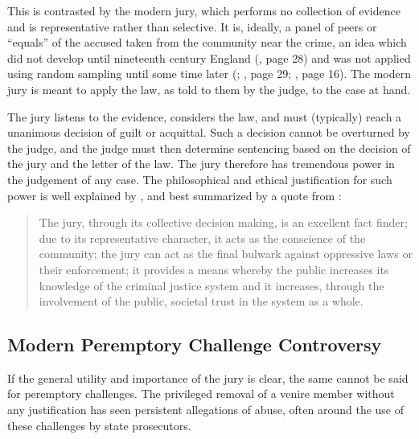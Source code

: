 This is contrasted by the modern jury, which performs no collection of evidence and is representative rather than
selective. It is, ideally, a panel of peers or ``equals'' of the accused taken from the community near the crime, an idea which
did not develop until nineteenth century England (\cite{hansvidjudging}, page 28) and was not applied using random sampling until
some time later (\cite{hoffman1997}; \cite{hansvidjudging}, page 29; \cite{vandykejurysel}, page 16). The modern jury
is meant to apply the law, as told to them by the judge\footnotemark, to the case at hand.

The jury listens to the evidence, considers the law, and must (typically) reach a unanimous
decision of guilt or acquittal. Such a decision cannot be overturned by the judge, and the judge must then determine
sentencing based on the decision of the jury and the letter of the law\footnotemark[\value{footnote}]. The
jury therefore has tremendous power in the judgement of any case. The philosophical and ethical justification for such power is
well explained by \cite{woolley2018}, and best summarized by a quote from \cite{rvsherratt}:


\begin{quote}
  The jury, through its collective decision making, is an excellent fact finder; due to its representative character, it acts as
  the conscience of the community; the jury can act as the final bulwark against oppressive laws or their enforcement; it provides
  a means whereby the public increases its knowledge of the criminal justice system and it increases, through the involvement of
  the public, societal trust in the system as a whole.
\end{quote}

\subsection{Modern Peremptory Challenge Controversy} \label{sec:modper}

If the general utility and importance of the jury is clear, the same cannot be said for peremptory challenges. The privileged
removal of a venire member without any justification
has seen persistent allegations of abuse, often around the use of these challenges by state prosecutors.

